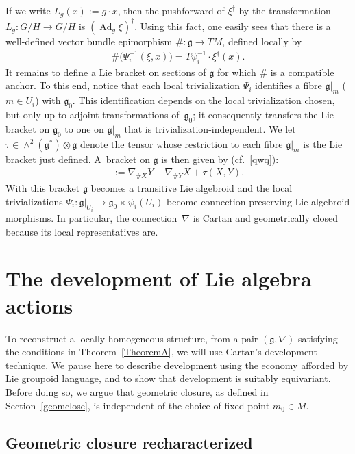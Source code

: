 \documentclass[11pt]{article}
\DeclareMathOperator{\Adjoint}{Ad}
\numberwithin{equation}{section}
\begin{document}
If we write $L_g(x):=g\cdot x$, then the pushforward of $\xi^\dagger$
by the transformation $L_g \colon G/H \rightarrow G/H$ is $(\Adjoint_g
\xi)^\dagger$. Using this fact, one easily sees that there is a
well-def\/ined vector bundle epimorphism $\# \colon {\mathfrak
  g} \rightarrow TM$, def\/ined locally by
\begin{gather*}
  \#\big(\Psi_i^{-1}(\xi,x)\big)=T \psi_i^{-1}\cdot \xi^\dagger(x).
\end{gather*}
It remains to def\/ine a Lie bracket on sections of $\mathfrak g$ for
which $\#$ is a compatible anchor. To this end, notice that each local
trivialization $\Psi_i$ identif\/ies a f\/ibre ${\mathfrak g}|_m$ ($m\in
U_i$) with ${\mathfrak g}_0$. This identif\/ication depends on the local
trivialization chosen, but only up to adjoint transformations of~${\mathfrak g}_0$; it consequently transfers the Lie bracket on
${\mathfrak g}_0$ to one on ${\mathfrak g}|_m$ that is
trivialization-independent. We let $\tau\in\wedge^2({\mathfrak
  g}^*)\otimes {\mathfrak g}$ denote the tensor whose restriction to
each f\/ibre ${\mathfrak g}|_m$ is the Lie bracket just def\/ined. A~bracket on ${\mathfrak g}$ is then given by
(cf.~\eqref{qwq}):
\begin{gather*}
  [ X, Y]:=\nabla_{\#X}Y-\nabla_{\#Y}X+\tau (X,Y).%
\end{gather*}
With this bracket $\mathfrak g$ becomes a transitive Lie algebroid and
the local trivializations $\Psi_i \colon {\mathfrak g}|_{U_i}
\rightarrow {\mathfrak g}_0 \times \psi_i(U_i)$ become
connection-preserving Lie algebroid morphisms. In particular, the
connec\-tion~$\nabla$ is Cartan and geometrically closed because its
local representatives are.

\section{The development of Lie algebra actions}\label{smoothact}
To reconstruct a locally homogeneous structure, from a pair
$({\mathfrak g},\nabla)$ satisfying the conditions in Theorem~\ref{TheoremA}, we
will use Cartan's development technique. We pause here to describe
development using the economy af\/forded by Lie groupoid language, and
to show that development is suitably equivariant. Before doing so, we
argue that geometric closure, as def\/ined in Section~\ref{geomclose}, is
independent of the choice of f\/ixed point $m_0 \in M$.

\subsection{Geometric closure recharacterized}\label{hudo}
\end{document}
